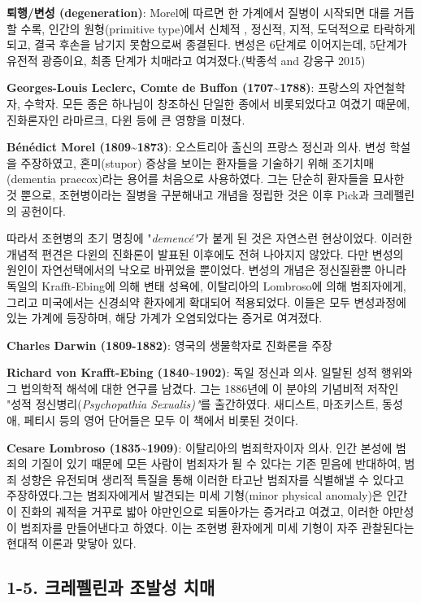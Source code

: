 \documentclass[
]{article}
\begin{document}
\textbf{퇴행/변성 (degeneration)}: Morel에 따르면 한 가계에서 질병이
시작되면 대를 거듭할 수록, 인간의 원형(primitive type)에서 신체적 ,
정신적, 지적, 도덕적으로 타락하게 되고, 결국 후손을 남기지 못함으로써
종결된다. 변성은 6단계로 이어지는데, 5단계가 유전적 광증이요, 최종
단계가 치매라고 여겨졌다.(박종석 and 강웅구 2015)

\textbf{Georges-Louis Leclerc, Comte de Buffon
(1707\textasciitilde1788)}: 프랑스의 자연철학자, 수학자. 모든 종은
하나님이 창조하신 단일한 종에서 비롯되었다고 여겼기 때문에, 진화론자인
라마르크, 다윈 등에 큰 영향을 미쳤다.

\textbf{Bénédict Morel (1809\textasciitilde1873)}: 오스트리아 출신의
프랑스 정신과 의사. 변성 학설을 주장하였고, 혼미(stupor) 증상을 보이는
환자들을 기술하기 위해 조기치매(dementia praecox)라는 용어를 처음으로
사용하였다. 그는 단순히 환자들을 묘사한 것 뿐으로, 조현병이라는 질병을
구분해내고 개념을 정립한 것은 이후 Pick과 크레펠린의 공헌이다.

따라서 조현병의 초기 명칭에 "\emph{demencé"}가 붙게 된 것은 자연스런
현상이었다. 이러한 개념적 편견은 다윈의 진화론이 발표된 이후에도 전혀
나아지지 않았다. 다만 변성의 원인이 자연선택에서의 낙오로 바뀌었을
뿐이었다. 변성의 개념은 정신질환뿐 아니라 독일의 Krafft-Ebing에 의해
변태 성욕에, 이탈리아의 Lombroso에 의해 범죄자에게, 그리고 미국에서는
신경쇠약 환자에게 확대되어 적용되었다. 이들은 모두 변성과정에 있는
가계에 등장하며, 해당 가계가 오염되었다는 증거로 여겨졌다.

\textbf{Charles Darwin (1809-1882)}: 영국의 생물학자로 진화론을 주장

\textbf{Richard von Krafft-Ebing (1840\textasciitilde1902)}: 독일 정신과
의사. 일탈된 성적 행위와 그 법의학적 해석에 대한 연구를 남겼다. 그는
1886년에 이 분야의 기념비적 저작인 "성적 정신병리(\emph{Psychopathia
Sexualis) "}를 출간하였다. 새디스트, 마조키스트, 동성애, 페티시 등의
영어 단어들은 모두 이 책에서 비롯된 것이다.

\textbf{Cesare Lombroso (1835\textasciitilde1909)}: 이탈리아의
범죄학자이자 의사. 인간 본성에 범죄의 기질이 있기 때문에 모든 사람이
범죄자가 될 수 있다는 기존 믿음에 반대하여, 범죄 성향은 유전되며 생리적
특질을 통해 이러한 타고난 범죄자를 식별해낼 수 있다고 주장하였다.그는
범죄자에게서 발견되는 미세 기형(minor physical anomaly)은 인간이 진화의
궤적을 거꾸로 밟아 야만인으로 되돌아가는 증거라고 여겼고, 이러한
야만성이 범죄자를 만들어낸다고 하였다. 이는 조현병 환자에게 미세 기형이
자주 관찰된다는 현대적 이론과 맞닿아 있다.

\hypertarget{kraepelin}{%
\subsection{1-5. 크레펠린과 조발성 치매}\label{kraepelin}}
\end{document}
